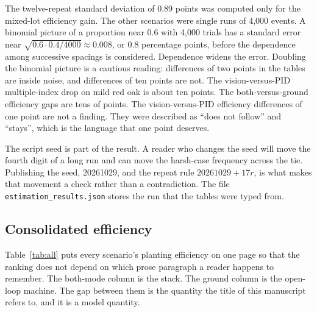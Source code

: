 The twelve-repeat standard deviation of 0.89 points was computed only for the mixed-lot efficiency gain. The other scenarios were single runs of 4{,}000 events. A binomial picture of a proportion near 0.6 with 4{,}000 trials has a standard error near $\sqrt{0.6\cdot 0.4/4000}\approx 0.008$, or 0.8 percentage points, before the dependence among successive spacings is considered. Dependence widens the error. Doubling the binomial picture is a cautious reading: differences of two points in the tables are inside noise, and differences of ten points are not. The vision-versus-PID multiple-index drop on mild red oak is about ten points. The both-versus-ground efficiency gaps are tens of points. The vision-versus-PID efficiency differences of one point are not a finding. They were described as ``does not follow'' and ``stays'', which is the language that one point deserves.

The script seed is part of the result. A reader who changes the seed will move the fourth digit of a long run and can move the harsh-case frequency across the tie. Publishing the seed, 20261029, and the repeat rule $20261029+17r$, is what makes that movement a check rather than a contradiction. The file \texttt{estimation\_results.json} stores the run that the tables were typed from.

\subsection{Consolidated efficiency}

Table~\ref{tab:all} puts every scenario's planting efficiency on one page so that the ranking does not depend on which prose paragraph a reader happens to remember. The both-mode column is the stack. The ground column is the open-loop machine. The gap between them is the quantity the title of this manuscript refers to, and it is a model quantity.

